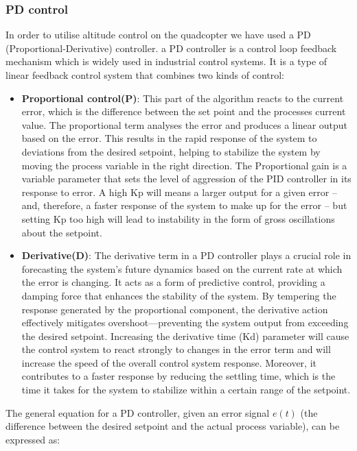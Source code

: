 \documentclass{article}
\begin{document}
\subsubsection{PD control}\label{PD_control}
In order to utilise altitude control on the quadcopter we have used a PD (Proportional-Derivative) controller. a PD controller is a control loop feedback mechanism which is widely used in industrial control systems. It is a type of linear feedback control system that combines two kinds of control:
\begin{itemize}
  \item \textbf{Proportional control(P)}: This part of the algorithm reacts to the current error, which is the difference between the set point and the processes current value. The proportional term analyses the error and produces a linear output based on the error. This results in the rapid 
  response of the system to deviations from the desired setpoint, helping to stabilize the system by moving the process variable in the right direction. The Proportional gain is a variable parameter that sets the level of aggression of the PID controller in its response to error. A high Kp will
  means a larger output for a given error – and, therefore, a faster response of the system to make up for the error – but setting Kp too high will lead to instability in the form of gross oscillations about the setpoint.
  \item \textbf{Derivative(D)}: The derivative term in a PD controller plays a crucial role in forecasting the system's future dynamics based on the current rate at which the error is changing. It acts as a form of predictive control, providing a damping force that enhances the stability of the system. 
  By tempering the response generated by the proportional component, the derivative action effectively mitigates overshoot—preventing the system output from exceeding the desired setpoint. Increasing the derivative time (Kd) parameter will cause the control system to react strongly to changes in the 
  error term and will increase the speed of the overall control system response. Moreover, it contributes to a faster response by reducing the settling time, which is the time it takes for the system to stabilize within a certain range of the setpoint.
\end{itemize}
The general equation for a PD controller, given an error signal \(e(t)\) (the difference between the desired setpoint and the actual process variable), can be expressed as:
\end{document}
